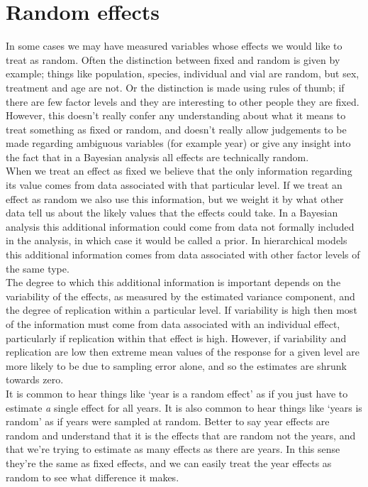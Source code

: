 \documentclass{article}
\begin{document}
\section{Random effects}
\label{ranef-sec}

In some cases we may have measured variables whose effects we would like to treat as random. Often the distinction between fixed and random is given by example; things like population, species, individual and vial are random, but sex, treatment and age are not. Or the distinction is made using rules of thumb; if there are few factor levels and they are interesting to other people they are fixed.  However, this doesn't really confer any understanding about what it means to treat something as fixed or random, and doesn't really allow judgements to be made regarding ambiguous variables (for example year) or give any insight into the fact that in a Bayesian analysis all effects are technically random.\\

When we treat an effect as fixed we believe that the only information regarding its value comes from data associated with that particular level. If we treat  an effect as random we also use this information, but we weight it by what other data tell us about the likely values that the effects could take. In a Bayesian analysis this additional information could come from data not formally included in the analysis, in which case it would be called a prior. In hierarchical models this additional information comes from data associated with other factor levels of the same type.\\

The degree to which this additional information is important depends on the variability of the effects, as measured by the estimated variance component, and the degree of replication within a particular level. If variability is high then most of the information must come from data associated with an individual effect, particularly if replication within that effect is high. However, if variability and replication are low then extreme mean values of the response for a given level are more likely to be due to sampling error alone, and so the estimates are shrunk towards zero.\\

It is common to hear things like `year is a random effect' as if you just have to estimate \emph{a} single effect for all years. It is also common to hear things like `years is random' as if years were sampled at random.  Better to say year effects are random and understand that it is the effects that are random not the years, and that we're trying to estimate as many effects as there are years.  In this sense they're the same as fixed effects, and we can easily treat the year effects as random to see what difference it makes.\\ 
\end{document}
